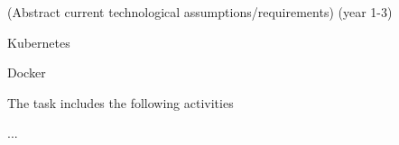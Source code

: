 \begin{task}[
  title=Reducing technical constraints for broader usage,
  id=constraints,
  lead=SRL,
  PM=1,
  wphases={0-36},
  partners={XXX}
]

(Abstract current technological assumptions/requirements) (year 1-3)

  \begin{compactitem}
  \item Kubernetes
  \item Docker
  \end{compactitem}

  The task includes the following activities
  \begin{compactitem}
  \item ...
  \end{compactitem}
\end{task}

